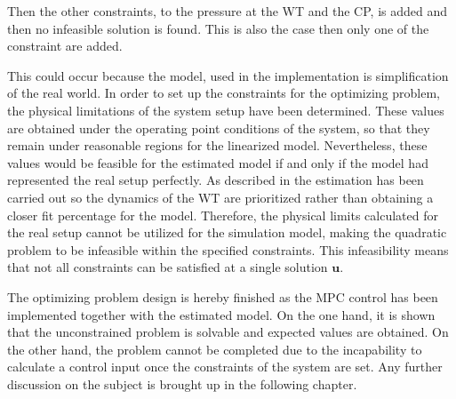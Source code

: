 Then the other constraints, to the pressure at the WT and the CP, is added and then no infeasible solution is found. This is also the case then only one of the constraint are added. 

This could occur because the model, used in the implementation is simplification of the real world. In order to set up the constraints for the optimizing problem, the physical limitations of the system setup have been determined. These values are obtained under the operating point conditions of the system, so that they remain under reasonable regions for the linearized model. Nevertheless, these values would be feasible for the estimated model if and only if the model had represented the real setup perfectly. As described in  the estimation has been carried out so the dynamics of the WT are prioritized rather than obtaining a closer fit percentage for the model. Therefore, the physical limits calculated for the real setup cannot be utilized for the simulation model, making the quadratic problem to be infeasible within the specified constraints. This infeasibility means that not all constraints can be satisfied at a single solution $\bm{u}$.

The optimizing problem design is hereby finished as the MPC control has been implemented together with the estimated model. On the one hand, it is shown that the unconstrained problem is solvable and expected values are obtained. On the other hand, the problem cannot be completed due to the incapability to calculate a control input once the constraints of the system are set. Any further discussion on the subject is brought up in the following chapter. 




%
%
%
%
%
